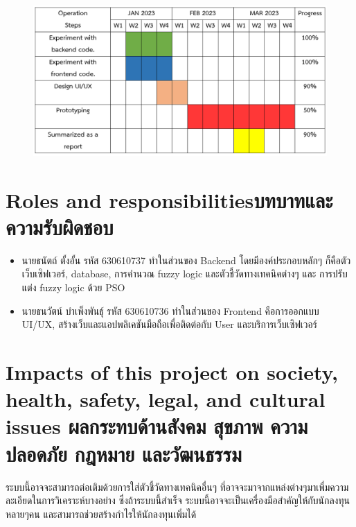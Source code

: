 \begin{figure}[ht]
    \centering
    \includegraphics[width=\textwidth]{images/plan_progress.png}
\end{figure}


\section{\ifenglish Roles and responsibilities\else บทบาทและความรับผิดชอบ\fi}
\begin{itemize}
    \item นายธนัตถ์ ตั้งอั้น รหัส 630610737 ทำในส่วนของ Backend โดยมีองค์ประกอบหลักๆ ก็คือตัวเว็บเซิฟเวอร์, database, การคำนวณ fuzzy logic และตัวชี้วัดทางเทคนิคต่างๆ และ
การปรับแต่ง fuzzy logic ด้วย PSO
    \item นายธนวัตน์ บำเพ็งพันธุ์ รหัส 630610736 ทำในส่วนของ Frontend คือการออกแบบ UI/UX, สร้างเว็บและแอปพลิเคชันมือถือเพื่อติดต่อกับ User และบริการเว็บเซิฟเวอร์
\end{itemize}

\section{\ifenglish%
Impacts of this project on society, health, safety, legal, and cultural issues
\else%
ผลกระทบด้านสังคม สุขภาพ ความปลอดภัย กฎหมาย และวัฒนธรรม
\fi}
ระบบนี้อาจจะสามารถต่อเติมด้วยการใส่ตัวชี้วัดทางเทคนิคอื่นๆ ที่อาจจะมาจากแหล่งต่างๆมาเพื่มความละเอียดในการวิเคราะห์บางอย่าง
ซึ่งถ้าระบบนี้สำเร็จ ระบบนี้อาจจะเป็นเครื่องมือสำคัญให้กับนักลงทุนหลายๆคน และสามารถช่วยสร้างกำไรให้นักลงทุนเพิ่มได้ 